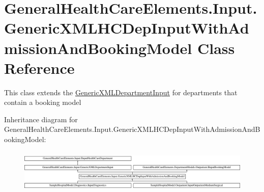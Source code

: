 \hypertarget{class_general_health_care_elements_1_1_input_1_1_generic_x_m_l_h_c_dep_input_with_admission_and_booking_model}{}\section{General\+Health\+Care\+Elements.\+Input.\+Generic\+X\+M\+L\+H\+C\+Dep\+Input\+With\+Admission\+And\+Booking\+Model Class Reference}
\label{class_general_health_care_elements_1_1_input_1_1_generic_x_m_l_h_c_dep_input_with_admission_and_booking_model}


This class extends the \hyperlink{class_general_health_care_elements_1_1_input_1_1_generic_x_m_l_department_input}{Generic\+X\+M\+L\+Department\+Input} for departments that contain a booking model  


Inheritance diagram for General\+Health\+Care\+Elements.\+Input.\+Generic\+X\+M\+L\+H\+C\+Dep\+Input\+With\+Admission\+And\+Booking\+Model\+:\begin{figure}[H]
\begin{center}
\leavevmode
\includegraphics[height=2.081784cm]{class_general_health_care_elements_1_1_input_1_1_generic_x_m_l_h_c_dep_input_with_admission_and_booking_model}
\end{center}
\end{figure}
